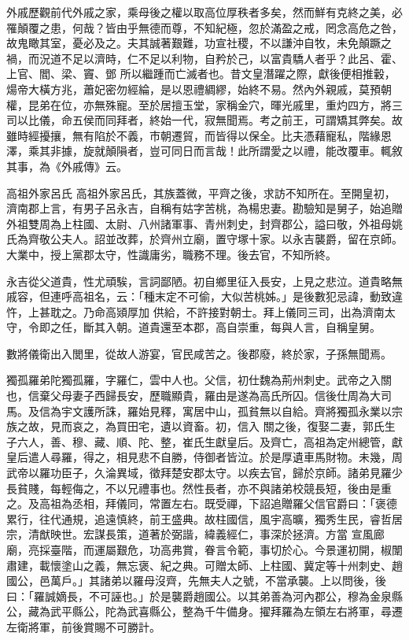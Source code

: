 
\begin{pinyinscope}

 外戚歷觀前代外戚之家，乘母後之權以取高位厚秩者多矣，然而鮮有克終之美，必罹顛覆之患，何哉？皆由乎無德而尊，不知紀極，忽於滿盈之戒，罔念高危之咎，故鬼瞰其室，憂必及之。夫其誠著艱難，功宣社稷，不以謙沖自牧，未免顛蹶之禍，而況道不足以濟時，仁不足以利物，自矜於己，以富貴驕人者乎？此呂、霍、上官、閻、梁、竇、鄧
 所以繼踵而亡滅者也。昔文皇潛躍之際，獻後便相推轂，煬帝大橫方兆，蕭妃密勿經綸，是以恩禮綢繆，始終不易。然內外親戚，莫預朝權，昆弟在位，亦無殊寵。至於居擅玉堂，家稱金穴，暉光戚里，重灼四方，將三司以比儀，命五侯而同拜者，終始一代，寂無聞焉。考之前王，可謂矯其弊矣。故雖時經擾攘，無有陷於不義，市朝遷貿，而皆得以保全。比夫憑藉寵私，階緣恩澤，乘其非據，旋就顛隕者，豈可同日而言哉！此所謂愛之以禮，能改覆車。輒敘其事，為《外戚傳》云。



 高祖外家呂氏
 高祖外家呂氏，其族蓋微，平齊之後，求訪不知所在。至開皇初，濟南郡上言，有男子呂永吉，自稱有姑字苦桃，為楊忠妻。勘驗知是舅子，始追贈外祖雙周為上柱國、太尉、八州諸軍事、青州刺史，封齊郡公，謚曰敬，外祖母姚氏為齊敬公夫人。詔並改葬，於齊州立廟，置守塚十家。以永吉襲爵，留在京師。大業中，授上黨郡太守，性識庸劣，職務不理。後去官，不知所終。



 永吉從父道貴，性尤頑騃，言詞鄙陋。初自鄉里征入長安，上見之悲泣。道貴略無戚容，但連呼高祖名，云：「種末定不可偷，大似苦桃姊。」是後數犯忌諱，動致違忤，上甚耽之。乃命高熲厚加
 供給，不許接對朝士。拜上儀同三司，出為濟南太守，令即之任，斷其入朝。道貴還至本郡，高自崇重，每與人言，自稱皇舅。



 數將儀衛出入閭里，從故人游宴，官民咸苦之。後郡廢，終於家，子孫無聞焉。



 獨孤羅弟陀獨孤羅，字羅仁，雲中人也。父信，初仕魏為荊州刺史。武帝之入關也，信棄父母妻子西歸長安，歷職顯貴，羅由是遂為高氏所囚。信後仕周為大司馬。及信為宇文護所誅，羅始見釋，寓居中山，孤貧無以自給。齊將獨孤永業以宗族之故，見而哀之，為買田宅，遺以資畜。初，信入
 關之後，復娶二妻，郭氏生子六人，善、穆、藏、順、陀、整，崔氏生獻皇后。及齊亡，高祖為定州總管，獻皇后遣人尋羅，得之，相見悲不自勝，侍御者皆泣。於是厚遺車馬財物。未幾，周武帝以羅功臣子，久淪異域，徵拜楚安郡太守。以疾去官，歸於京師。諸弟見羅少長貧賤，每輕侮之，不以兄禮事也。然性長者，亦不與諸弟校競長短，後由是重之。及高祖為丞相，拜儀同，常置左右。既受禪，下詔追贈羅父信官爵曰：「褒德累行，往代通規，追遠慎終，前王盛典。故柱國信，風宇高曠，獨秀生民，睿哲居宗，清猷映世。宏謀長策，道著於弼諧，緯義經仁，事深於拯濟。方當
 宣風廊廟，亮採臺階，而運屬艱危，功高弗賞，眷言令範，事切於心。今景運初開，椒闈肅建，載懷塗山之義，無忘褒、紀之典。可贈太師、上柱國、冀定等十州刺史、趙國公，邑萬戶。」其諸弟以羅母沒齊，先無夫人之號，不當承襲。上以問後，後曰：「羅誠嫡長，不可誣也。」於是襲爵趙國公。以其弟善為河內郡公，穆為金泉縣公，藏為武平縣公，陀為武喜縣公，整為千牛備身。擢拜羅為左領左右將軍，尋遷左衛將軍，前後賞賜不可勝計。




\end{pinyinscope}
